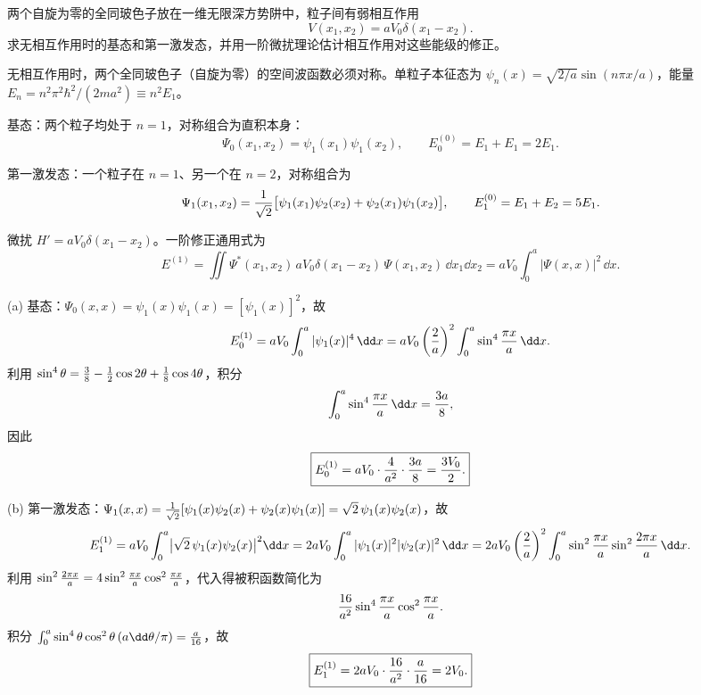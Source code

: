 \begin{question}
两个自旋为零的全同玻色子放在一维无限深方势阱中，粒子间有弱相互作用
\[
V(x_1,x_2)=aV_0\delta(x_1-x_2).
\]
求无相互作用时的基态和第一激发态，并用一阶微扰理论估计相互作用对这些能级的修正。
\end{question}
\begin{solution}
无相互作用时，两个全同玻色子（自旋为零）的空间波函数必须对称。单粒子本征态为 $\psi_n(x)=\sqrt{2/a}\sin(n\pi x/a)$，能量 $E_n=n^2\pi^2\hbar^2/(2ma^2)\equiv n^2E_1$。

基态：两个粒子均处于 $n=1$，对称组合为直积本身：
\[
\Psi_0(x_1,x_2)=\psi_1(x_1)\psi_1(x_2),\qquad
E_0^{(0)}=E_1+E_1=2E_1.
\]

第一激发态：一个粒子在 $n=1$、另一个在 $n=2$，对称组合为
\[
\Psi_1(x_1,x_2)={1\over\sqrt2}\bigl[\psi_1(x_1)\psi_2(x_2)+\psi_2(x_1)\psi_1(x_2)\bigr],
\qquad
E_1^{(0)}=E_1+E_2=5E_1.
\]

微扰 $H'=aV_0\delta(x_1-x_2)$。一阶修正通用式为
\[
E^{(1)}=\iint \Psi^*(x_1,x_2)\,aV_0\delta(x_1-x_2)\,\Psi(x_1,x_2)\,\dd x_1\dd x_2
=aV_0\int_0^a |\Psi(x,x)|^2\,\dd x.
\]

(a) 基态：$\Psi_0(x,x)=\psi_1(x)\psi_1(x)=[\psi_1(x)]^2$，故
\[
E_0^{(1)}=aV_0\int_0^a |\psi_1(x)|^4\,\dd x
=aV_0\left({2\over a}\right)^2\int_0^a \sin^4{\pi x\over a}\,\dd x.
\]
利用 $\sin^4\theta={3\over8}-{1\over2}\cos2\theta+{1\over8}\cos4\theta$，积分
\[
\int_0^a \sin^4{\pi x\over a}\,\dd x={3a\over8},
\]
因此
\[
\boxed{E_0^{(1)}=aV_0\cdot{4\over a^2}\cdot{3a\over8}={3V_0\over2}.}
\]

(b) 第一激发态：$\Psi_1(x,x)={1\over\sqrt2}[\psi_1(x)\psi_2(x)+\psi_2(x)\psi_1(x)]=\sqrt2\,\psi_1(x)\psi_2(x)$，故
\[
E_1^{(1)}=aV_0\int_0^a \bigl|\sqrt2\,\psi_1(x)\psi_2(x)\bigr|^2\dd x
=2aV_0\int_0^a |\psi_1(x)|^2|\psi_2(x)|^2\,\dd x
=2aV_0\left({2\over a}\right)^2\int_0^a \sin^2{\pi x\over a}\sin^2{2\pi x\over a}\,\dd x.
\]
利用 $\sin^2{2\pi x\over a}=4\sin^2{\pi x\over a}\cos^2{\pi x\over a}$，代入得被积函数简化为
\[
{16\over a^2}\sin^4{\pi x\over a}\cos^2{\pi x\over a}.
\]
积分 $\int_0^a\sin^4\theta\cos^2\theta\,(a\dd\theta/\pi)={a\over16}$，故
\[
\boxed{E_1^{(1)}=2aV_0\cdot{16\over a^2}\cdot{a\over16}=2V_0.}
\]
\end{solution}

